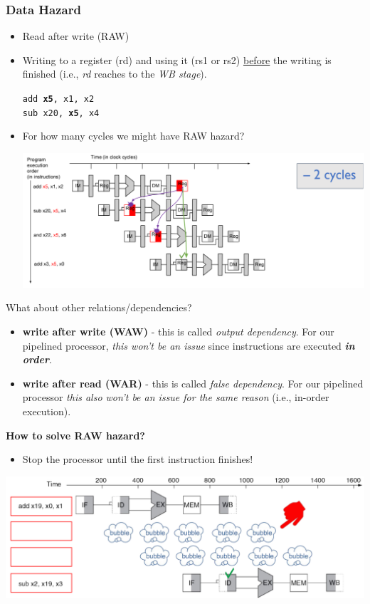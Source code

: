 \documentclass[10pt]{article}
\begin{document}
\subsubsection*{Data Hazard}
\begin{itemize}
    \item Read after write (RAW)
    \item Writing to a register (rd) and using it (rs1 or rs2) \underline{before} the writing is finished (i.e., \textit{rd} reaches to the \textit{WB stage}).
    \begin{center}
        \texttt{add \textbf{x5}, x1, x2}\\
        \texttt{sub x20, \textbf{x5}, x4}
    \end{center}
    \item For how many cycles we might have RAW hazard?
    \begin{center}
        \includegraphics*[scale=0.5]{W3_8.png}
    \end{center}
\end{itemize}
What about other relations/dependencies?
\begin{itemize}
    \item \textbf{write after write (WAW)} - this is called \textit{output dependency}.  For our pipelined processor, \textit{this won't be an issue} since instructions are executed \textit{\textbf{in order}}.
    \item \textbf{write after read (WAR)} - this is called \textit{false dependency}.  For our pipelined processor \textit{this also won't be an issue for the same reason} (i.e., in-order execution).
\end{itemize}
\textbf{How to solve RAW hazard?}
\begin{itemize}
    \item Stop the processor until the first instruction finishes!
\end{itemize}
\begin{center}
    \includegraphics*[scale=0.5]{W3_9.png}
\end{center}
\end{document}

